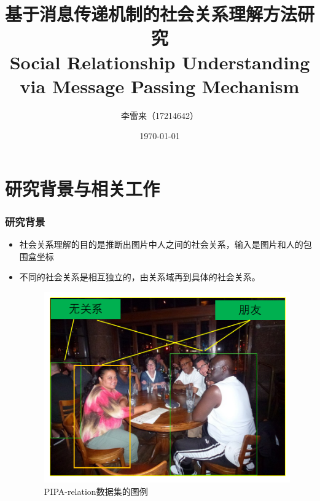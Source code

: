 \documentclass[UTF8]{beamer}
\begin{document}
    \title{基于消息传递机制的社会关系理解方法研究\\
         Social Relationship Understanding via Message Passing Mechanism
    }
    \author{李雷来（17214642）}
    \date{\today}
    \frame{\titlepage}

\section{研究背景与相关工作}

\begin{frame}
\frametitle{研究背景}
    \begin{itemize}
       \item 社会关系理解的目的是推断出图片中人之间的社会关系，输入是图片和人的包围盒坐标
       \item 不同的社会关系是相互独立的，由关系域再到具体的社会关系。
       \begin{figure}[htpb]
        	\centering
            	\includegraphics[width=0.58 \textwidth,clip]{images/example-1.png}
                \caption{PIPA-relation数据集\cite{sun2017a}的图例}
        	\label{fig:exp-statistic}
    \end{figure}
    \end{itemize}
\end{frame}
\end{document}
